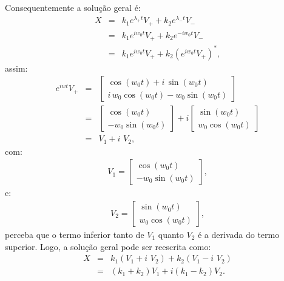 \documentclass[12pt,openright,twoside,english,brazil]{abntex2}
\begin{document}
\begin{enumerate}[label=\alph*)]
Consequentemente a solução geral é:
\begin{eqnarray}
 X & = & k_1 e^{\lambda_{+}t} V_{+} + k_2 e^{\lambda_{-}t} V_{-} \nonumber \\
   & = & k_1 e^{iw_0t} V_{+} + k_2 e^{-iw_0t} V_{-} \nonumber \\
   & = & k_1 e^{iw_0t} V_{+} + k_2 \left( e^{iw_0t} V_{+} \right)^{*},
\end{eqnarray}
assim:
\begin{eqnarray}
 e^{iwt}V_{+} & = & \begin{bmatrix}
                 \cos{(w_0t)} + i\, \sin{(w_0t)} \\
                i\, w_0\cos{(w_0t)} - w_0 \sin{(w_0t)}
                \end{bmatrix} \nonumber \\
              & = & \begin{bmatrix}
                     \cos{(w_0t)} \\
                     -w_0 \sin{(w_0t)}
                    \end{bmatrix} + i \begin{bmatrix}
                                       \sin{(w_0t)} \\
                                       w_0 \cos{(w_0t)}
                                      \end{bmatrix} \nonumber \\
              & = & V_{1} + i \, \, V_{2},
\end{eqnarray}
com:
\begin{eqnarray}
 V_1 = \begin{bmatrix}
        \cos{(w_0t)} \\
        -w_0 \sin{(w_0t)}
       \end{bmatrix}, \nonumber
\end{eqnarray}
e:
\begin{eqnarray}
 V_2 = \begin{bmatrix}
        \sin{(w_0t)} \\
        w_0 \cos{(w_0t)}
       \end{bmatrix}, \nonumber
\end{eqnarray}
perceba que o termo inferior tanto de $V_1$ quanto $V_2$ é a derivada do termo superior. Logo, a solução geral pode ser reescrita como:
\begin{eqnarray}
 X & = & k_1 (V_1 + i\, \, V_2) + k_2 (V_1 - i\, \, V_2) \nonumber \\
   & = & (k_1 + k_2) V_1 + i (k_1 - k_2) V_2.

\end{eqnarray}
\end{enumerate}
\end{document}

